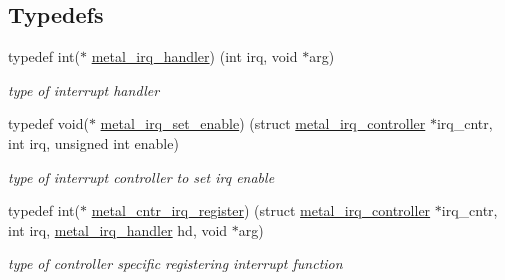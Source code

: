 \subsection*{Typedefs}
\begin{DoxyCompactItemize}
\item 
typedef int($\ast$ \hyperlink{group__irq_ga4fd6caa764267fc62373ae22e17aea2a}{metal\+\_\+irq\+\_\+handler}) (int irq, void $\ast$arg)
\begin{DoxyCompactList}\small\item\em type of interrupt handler \end{DoxyCompactList}\item 
typedef void($\ast$ \hyperlink{group__irq_ga125a768ecd5924b3da91b6ebb6820e9a}{metal\+\_\+irq\+\_\+set\+\_\+enable}) (struct \hyperlink{structmetal__irq__controller}{metal\+\_\+irq\+\_\+controller} $\ast$irq\+\_\+cntr, int irq, unsigned int enable)
\begin{DoxyCompactList}\small\item\em type of interrupt controller to set irq enable \end{DoxyCompactList}\item 
typedef int($\ast$ \hyperlink{group__irq_ga22c994407d005793e478ac8267744f88}{metal\+\_\+cntr\+\_\+irq\+\_\+register}) (struct \hyperlink{structmetal__irq__controller}{metal\+\_\+irq\+\_\+controller} $\ast$irq\+\_\+cntr, int irq, \hyperlink{group__irq_ga4fd6caa764267fc62373ae22e17aea2a}{metal\+\_\+irq\+\_\+handler} hd, void $\ast$arg)
\begin{DoxyCompactList}\small\item\em type of controller specific registering interrupt function \end{DoxyCompactList}\end{DoxyCompactItemize}
